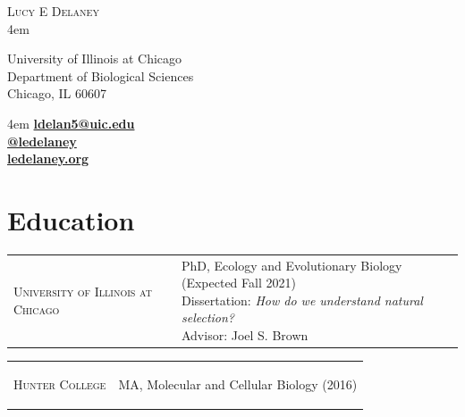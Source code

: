 \documentclass[]{article}
\begin{document}
\BgThispage
\pagestyle{alldocument}

{\fontsize{20}{64}\selectfont \textsc{Lucy E Delaney}}\\
\leftskip 4em
\begin{multicols}{2}

University of Illinois at Chicago\\
Department of Biological Sciences\\
Chicago, IL 60607

\columnbreak

\begin{flushright}
\rightskip 4em
\href{mailto:ldelan5@uic.edu}{\textbf{ldelan5@uic.edu}} \faPaperPlane\\
\href{https://github.com/ledelaney}{\textbf{@ledelaney}} \faGithub\\
\href{https://ledelaney.org}{\textbf{ledelaney.org}} \faDesktop
\end{flushright}

\end{multicols}

\vspace{3mm}

\section{\fontsize{16}{48}\selectfont Education}

\begin{tabular}{l | l}
\parbox{0.30\textwidth}{
\begin{center}
\textsc{University of Illinois at Chicago}
\end{center}
}
&
\parbox{0.65\textwidth}{
PhD, Ecology and Evolutionary Biology (Expected Fall 2021)\\
Dissertation: \textit{How do we understand natural selection?}\\
Advisor: Joel S. Brown
}
\end{tabular}

\vspace{3mm}

\begin{tabular}{l | l}
\parbox{0.30\textwidth}{
\begin{center}
\textsc{Hunter College}
\end{center}
}
&
\parbox{0.65\textwidth}{
MA, Molecular and Cellular Biology (2016)
}
\end{tabular}

\vspace{3mm}
\end{document}
